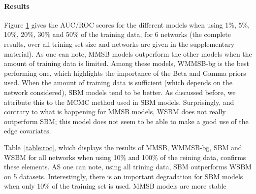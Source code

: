 \begin{figure}[h]
\centering
	
   \label{fig:roc}
\end{figure}

\paragraph{Results} Figure \ref{fig:roc} gives the AUC/ROC scores for the different models when using 1\%, 5\%, 10\%, 20\%, 30\% and 50\% of the training data, for 6 networks (the complete results, over all trining set size and networks are given in the supplementary material). As one can note, MMSB models outperform the other models when the amount of training data is limited. Among these models, WMMSB-bg is the best performing one, which highlights the importance of the Beta and Gamma priors used. When the amount of training data is sufficient (which depends on the network considered), SBM models tend to be better. As discussed before, we attribute this to the MCMC method used in SBM models. Surprisingly, and contrary to what is happening for MMSB models, WSBM does not really outperform SBM; this model does not seem to be able to make a good use of the edge covariates. 

Table~\ref{table:roc}, which displays the results of MMSB, WMMSB-bg, SBM and WSBM for all networks when using 10\% and 100\% of the reining data, confirms these elements. AS one can note, using all trining data, SBM outperforms WSBM on 5 datasets. Interestingly, there is an important degradation for SBM models when only 10\% of the training set is used. MMSB models are more stable 
 

